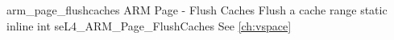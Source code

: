 %
%
%
%

\apidoc
{arm_page_flushcaches}
{ARM Page - Flush Caches}
{Flush a cache range}
{static inline int seL4\_ARM\_Page\_FlushCaches}
{
}
{\errorenumdesc}
{See \autoref{ch:vspace}}
